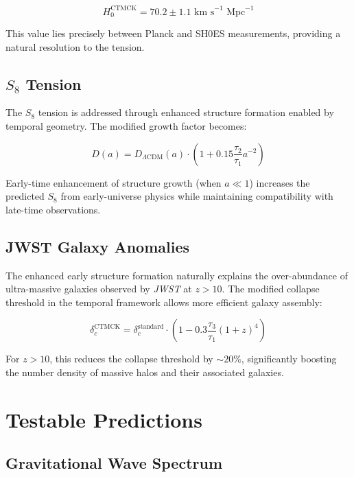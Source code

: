 \documentclass[reprint,amsmath,amssymb,aps,prd,nofootinbib,longbibliography]{revtex4-2}
\begin{document}
\begin{equation}
H_0^{\text{CTMCK}} = 70.2 \pm 1.1 \text{ km s}^{-1} \text{ Mpc}^{-1}
\end{equation}

This value lies precisely between Planck and SH0ES measurements, providing a natural resolution to the tension.

\subsection{$S_8$ Tension}

The $S_8$ tension is addressed through enhanced structure formation enabled by temporal geometry. The modified growth factor becomes:

\begin{equation}
D(a) = D_{\Lambda\text{CDM}}(a) \cdot \left(1 + 0.15 \frac{\tau_2}{\tau_1} a^{-2}\right)
\end{equation}

Early-time enhancement of structure growth (when $a \ll 1$) increases the predicted $S_8$ from early-universe physics while maintaining compatibility with late-time observations.

\subsection{JWST Galaxy Anomalies}

The enhanced early structure formation naturally explains the over-abundance of ultra-massive galaxies observed by \textit{JWST} at $z > 10$. The modified collapse threshold in the temporal framework allows more efficient galaxy assembly:

\begin{equation}
\delta_c^{\text{CTMCK}} = \delta_c^{\text{standard}} \cdot \left(1 - 0.3 \frac{\tau_3}{\tau_1} (1+z)^4\right)
\end{equation}

For $z > 10$, this reduces the collapse threshold by $\sim 20\%$, significantly boosting the number density of massive halos and their associated galaxies.

\section{Testable Predictions}

\subsection{Gravitational Wave Spectrum}
\end{document}
